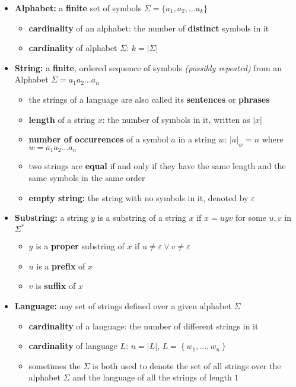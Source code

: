 \documentclass[english]{article}
\begin{document}
\begin{itemize}
  \item \textbf{Alphabet:} a \textbf{finite} set of symbols \(\Sigma = \{a_1, a_2, \ldots a_k\}\)
        \begin{itemize}
          \item \textbf{cardinality} of an alphabet: the number of \textbf{distinct} symbols in it
          \item \textbf{cardinality} of alphabet \(\Sigma\): \(k = \left|\Sigma\right|\)
        \end{itemize}
  \item \textbf{String:} a \textbf{finite}, ordered sequence of symbols \textit{(possibly repeated)} from an Alphabet \(\Sigma = a_1a_2\ldots a_n\)
        \begin{itemize}
          \item the strings of a language are also called its \textbf{sentences} or \textbf{phrases}
          \item \textbf{length} of a string \(x\): the number of symbols in it, written as \(|x|\)
          \item \textbf{number of occurrences} of a symbol \(a\) in a string \(w\): \(\left|a\right|_w = n\) where \(w = a_1a_2\ldots a_n\)
          \item two strings are \textbf{equal} if and only if they have the same length and the same symbols in the same order
          \item \textbf{empty string:} the string with no symbols in it, denoted by \(\varepsilon\)
        \end{itemize}
  \item \textbf{Substring:} a string \(y\) is a substring of a string \(x\) if \(x = uyv\) for some \(u, v\) in \(\Sigma^\ast\)
        \begin{itemize}
          \item \(y\) is a \textbf{proper} substring of \(x\) if \(u \neq \varepsilon \lor v \neq \varepsilon\)
          \item \(u\) is a \textbf{prefix} of \(x\)
          \item \(v\) is \textbf{suffix} of \(x\)
        \end{itemize}
  \item \textbf{Language:} any set of strings defined over a given alphabet \(\Sigma\)
        \begin{itemize}
          \item \textbf{cardinality} of a language: the number of different strings in it
          \item \textbf{cardinality} of language \(L\): \(n = \left| L \right|\), \(L =  \left\{ w_1, \ldots, w_n \right\}\)
          \item sometimes the \(\Sigma\) is both used to denote the set of all strings over the alphabet \(\Sigma\) and the language of all the strings of length \(1\)
        \end{itemize}
\end{itemize}
\end{document}
